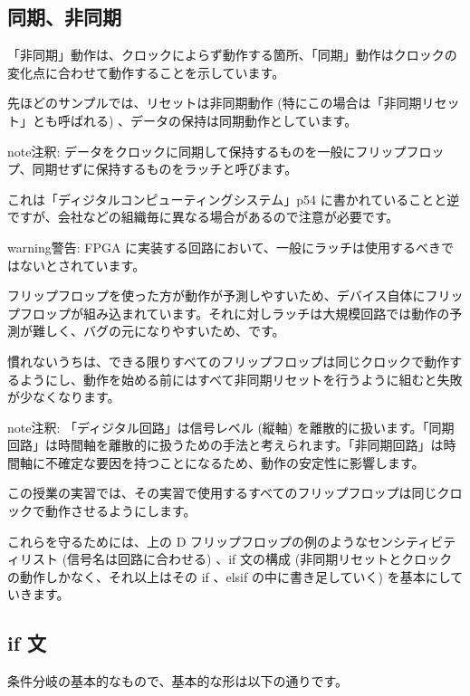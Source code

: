 \documentclass[letterpaper,10pt,dvipdfmx]{sphinxmanual}
\begin{document}
\subsection{同期、非同期}
\label{\detokenize{05_try:id10}}
「非同期」動作は、クロックによらず動作する箇所、「同期」動作はクロックの変化点に合わせて動作することを示しています。

先ほどのサンプルでは、リセットは非同期動作 (特にこの場合は「非同期リセット」とも呼ばれる) 、データの保持は同期動作としています。

\begin{sphinxadmonition}{note}{注釈:}
データをクロックに同期して保持するものを一般にフリップフロップ、同期せずに保持するものをラッチと呼びます。

これは「ディジタルコンピューティングシステム」p54 に書かれていることと逆ですが、会社などの組織毎に異なる場合があるので注意が必要です。
\end{sphinxadmonition}

\begin{sphinxadmonition}{warning}{警告:}
FPGA に実装する回路において、一般にラッチは使用するべきではないとされています。

フリップフロップを使った方が動作が予測しやすいため、デバイス自体にフリップフロップが組み込まれています。それに対しラッチは大規模回路では動作の予測が難しく、バグの元になりやすいため、です。

慣れないうちは、できる限りすべてのフリップフロップは同じクロックで動作するようにし、動作を始める前にはすべて非同期リセットを行うように組むと失敗が少なくなります。
\end{sphinxadmonition}

\begin{sphinxadmonition}{note}{注釈:}
「ディジタル回路」は信号レベル (縦軸) を離散的に扱います。「同期回路」は時間軸を離散的に扱うための手法と考えられます。「非同期回路」は時間軸に不確定な要因を持つことになるため、動作の安定性に影響します。

この授業の実習では、その実習で使用するすべてのフリップフロップは同じクロックで動作させるようにします。

これらを守るためには、上の D フリップフロップの例のようなセンシティビティリスト (信号名は回路に合わせる) 、if 文の構成 (非同期リセットとクロックの動作しかなく、それ以上はその if 、elsif の中に書き足していく) を基本にしていきます。
\end{sphinxadmonition}


\subsection{if 文}
\label{\detokenize{05_try:id11}}
条件分岐の基本的なもので、基本的な形は以下の通りです。
\end{document}
